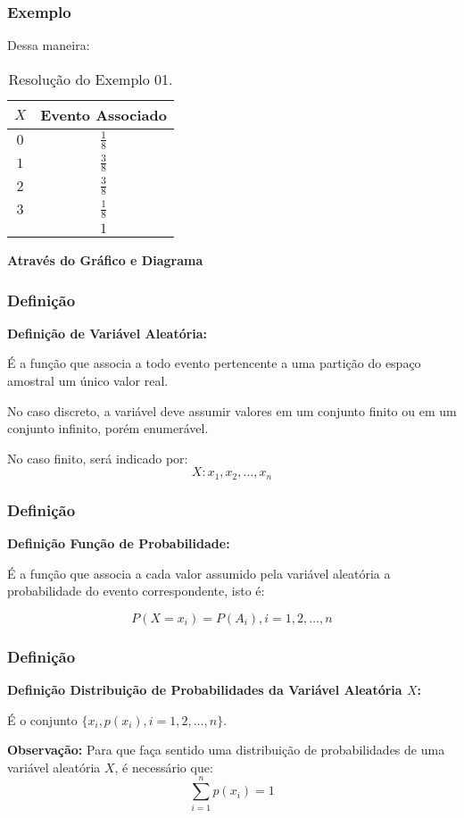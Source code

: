\documentclass[hyperref={pdfpagelabels=false}]{beamer}
\begin{document}
\begin{frame}
	\frametitle{Exemplo}
	
Dessa maneira:
	
	\begin{table}[!h]
		\centering
		\begin{tabular}{|c|c|}
			\hline
			$X$		&	Evento Associado \\ \hline \pause
			$0$		&	$\displaystyle \frac{1}{8}$	\\ \hline \pause
			$1$		&	$\displaystyle \frac{3}{8}$	\\ \hline \pause
			$2$		&	$\displaystyle \frac{3}{8}$	\\ \hline \pause
			$3$		&	$\displaystyle \frac{1}{8}$	\\ \hline
					&	$1$							\\ \hline
		\end{tabular}
		\caption{Resolução do Exemplo 01.}
	\end{table}
	\pause
	
	{\bf Através do Gráfico e Diagrama}
	
\end{frame}




\begin{frame}
\frametitle{Definição}
	
{\bf Definição de Variável Aleatória:}

É a função que associa a todo evento pertencente a uma partição do espaço amostral um único valor real.

No caso discreto, a variável deve assumir valores em um conjunto finito ou em um conjunto infinito, porém enumerável.

No caso finito, será indicado por:
$$X: x_1,x_2,\dots,x_n$$
	
\end{frame}


\begin{frame}
\frametitle{Definição}

{\bf Definição Função de Probabilidade:}

É a função que associa a cada valor assumido pela variável aleatória a probabilidade do evento correspondente, isto é:

$$P(X=x_i) = P(A_i),i=1,2,\dots,n$$
\end{frame}


\begin{frame}
\frametitle{Definição}

{\bf Definição Distribuição de Probabilidades da Variável Aleatória $X$:}

	É o conjunto $\{ x_i, p(x_i), i=1,2,\dots,n \}$.
	
	\pause
	
	{\bf Observação:} Para que faça sentido uma distribuição de probabilidades de uma variável aleatória $X$, é necessário que:
	$$\sum_{i=1}^{n}p(x_i) = 1$$
\end{frame}
\end{document}
